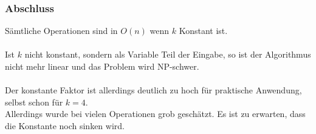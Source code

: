 \begin{frame}
\frametitle{Abschluss}
Sämtliche Operationen sind in $O(n)$ wenn $k$ Konstant ist. \\
\ \\
Ist $k$ nicht konstant, sondern als Variable Teil der Eingabe, so ist der Algorithmus nicht mehr linear und das Problem wird NP-schwer. \\
\ \\
Der konstante Faktor ist allerdings deutlich zu hoch für praktische Anwendung, selbst schon für $k=4$. \\
Allerdings wurde bei vielen Operationen grob geschätzt. Es ist zu erwarten, dass die Konstante noch sinken wird. \\
\end{frame}
